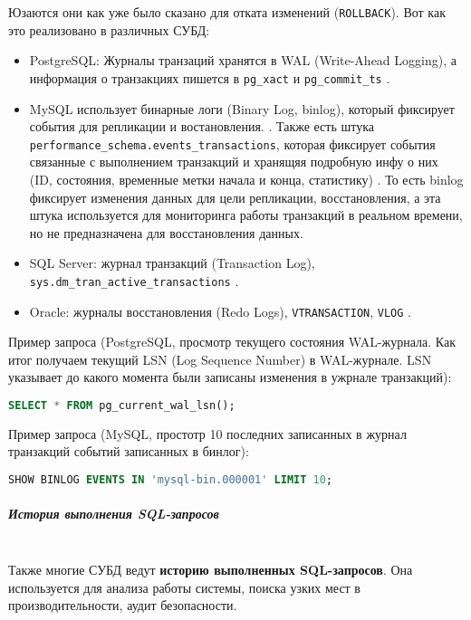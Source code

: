 Юзаются они как уже было сказано для отката изменений (\texttt{ROLLBACK}).
Вот как это реализовано в различных СУБД:

\begin{itemize}
    \item PostgreSQL: Журналы транзаций хранятся в WAL (Write-Ahead Logging), а информация о транзакциях пишется в \texttt{pg\_xact} и \texttt{pg\_commit\_ts} \autocite{PostgreSQLdocc28}.
    \item MySQL использует бинарные логи (Binary Log, binlog), который фиксирует события для репликации и востановления. \autocite{Mysqldoc3}. Также есть штука \texttt{performance\_schema.events\_transactions}, которая фиксирует события связанные с выполнением транзакций и хранящяя подробную инфу о них (ID, состояния, временные метки начала и конца, статистику) \autocite{Mysqldoc2}. То есть binlog фиксирует изменения данных для цели репликации, восстановления, а эта штука используется для мониторинга работы транзакций в реальном времени, но не предназначена для восстановления данных. 
    \item SQL Server: журнал транзакций (Transaction Log), \texttt{sys.dm\_tran\_active\_transactions} \autocite{MicrosoftLearnSQLserverTransLog}.
    \item Oracle: журналы восстановления (Redo Logs), \texttt{V\textdollar TRANSACTION}, \texttt{V\textdollar LOG} \autocite{OracleRedoLog}.
\end{itemize}

Пример запроса (PostgreSQL, просмотр текущего состояния WAL-журнала. Как итог получаем текущий LSN (Log Sequence Number) в WAL-журнале. LSN указывает до какого момента были записаны изменения в ужрнале транзакций):
\begin{lstlisting}[language=SQL]
    SELECT * FROM pg_current_wal_lsn();                
\end{lstlisting}

Пример запроса (MySQL, простотр 10 последних записанных в журнал транзакций событий записанных в бинлог):
\begin{lstlisting}[language=SQL]
    SHOW BINLOG EVENTS IN 'mysql-bin.000001' LIMIT 10;           
\end{lstlisting}

\subparagraph{История выполнения SQL-запросов} ~\\

Также многие СУБД ведут \textbf{историю выполненных SQL-запросов}. Она используется для анализа работы системы, поиска узких мест в производительности, аудит безопасности. 

